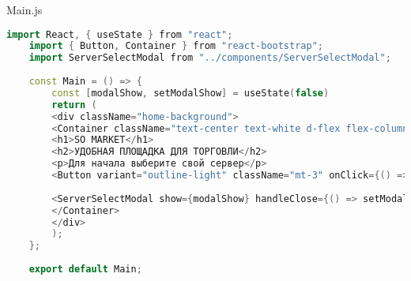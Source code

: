 Main.js
\begin{lstlisting}[language=C++]
	import React, { useState } from "react";
	import { Button, Container } from "react-bootstrap";
	import ServerSelectModal from "../components/ServerSelectModal";
	
	const Main = () => {
		const [modalShow, setModalShow] = useState(false)
		return (
		<div className="home-background">
		<Container className="text-center text-white d-flex flex-column justify-content-center align-items-center vh-100">
		<h1>SO MARKET</h1>
		<h2>УДОБНАЯ ПЛОЩАДКА ДЛЯ ТОРГОВЛИ</h2>
		<p>Для начала выберите свой сервер</p>
		<Button variant="outline-light" className="mt-3" onClick={() => setModalShow(true)}>Выбрать сервер</Button>
		
		<ServerSelectModal show={modalShow} handleClose={() => setModalShow(false)} />
		</Container>
		</div>
		);
	};
	
	export default Main;
\end{lstlisting}

